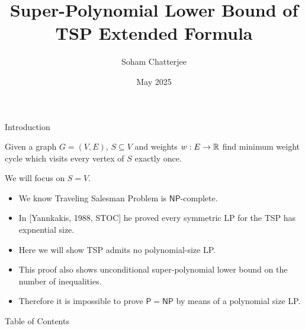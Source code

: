 \documentclass[aspectratio=1610]{beamer}
\title{Super-Polynomial Lower Bound of TSP Extended Formula}
\date{May 2025}
\author{Soham Chatterjee}
\renewcommand{\P}{\ensuremath{\mathsf{P}}}
\newcommand{\NP}{\ensuremath{\mathsf{NP}}}
\begin{document}
\begin{frame}
	\titlepage
\end{frame}



\begin{frame}{Introduction}
	\begin{definition}
		Given a graph $G=(V,E)$, $S\subseteq V$ and weights $w:E\to \mathbb{R}$ find minimum weight cycle which visits every vertex of $S$ exactly once.
	\end{definition}\pause

	We will focus on $S=V$.
	\begin{itemize}
		\item We know Traveling Salesman Problem is $\NP$-complete.
		\item In [Yannkakis, 1988, STOC] he proved every symmetric LP for the TSP has expnential size.
		\item Here we will show TSP admits no polynomial-size LP.
		\item This proof also shows unconditional super-polynomial lower bound on the number of inequalities.
		\item Therefore it is impossible to prove $\P=\NP$ by means of a polynomial size LP.
	\end{itemize}
\end{frame}
\begin{frame}{Table of Contents}
    \tableofcontents
\end{frame}
\end{document}
